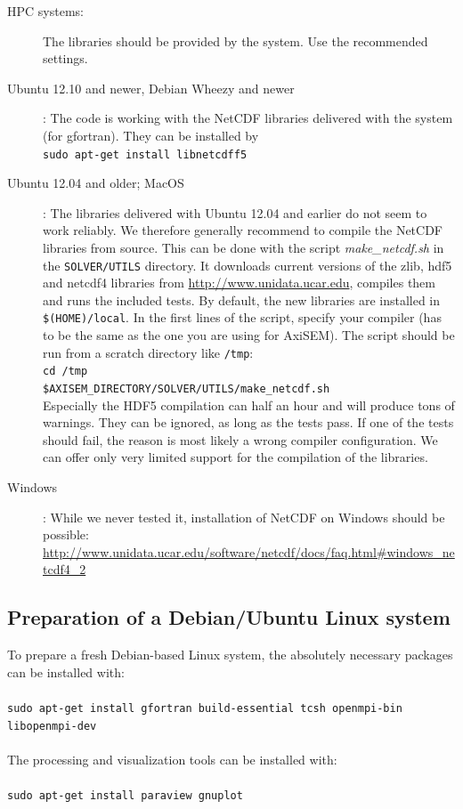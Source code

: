 \documentclass{article}
\begin{document}
\begin{description}
    \item[HPC systems:] The libraries should be provided by the system. Use the
          recommended settings.
    \item[Ubuntu 12.10 and newer, Debian Wheezy and newer]: The code is working with the NetCDF libraries delivered
          with the system (for gfortran). They can be installed by \\
          \verb|sudo apt-get install libnetcdff5|
    \item[Ubuntu 12.04 and older; MacOS]: The libraries delivered with Ubuntu 12.04 and
          earlier do not seem to work reliably. We therefore generally recommend to
          compile the NetCDF libraries from source. This can be done with the script
          \textit{make\_netcdf.sh} in the \verb|SOLVER/UTILS| directory. It downloads
          current versions of the zlib, hdf5 and netcdf4 libraries from
          \url{http://www.unidata.ucar.edu}, compiles them and runs the included tests. By
          default, the new libraries are installed in \verb|$(HOME)/local|. In the first
          lines of the script, specify your compiler (has to be the same as the one you
          are using for AxiSEM). The script should be run from a scratch directory like
          \verb|/tmp|:\\
          \verb|cd /tmp|\\
          \verb|$AXISEM_DIRECTORY/SOLVER/UTILS/make_netcdf.sh|\\
          Especially the HDF5 compilation can half an hour and will produce tons of warnings. They can be
          ignored, as long as the tests pass. If one of the tests should fail, the reason
          is most likely a wrong compiler configuration. We can offer only very limited
          support for the compilation of the libraries.
    \item[Windows]: While we never tested it, installation of NetCDF on Windows should be
          possible: \url{http://www.unidata.ucar.edu/software/netcdf/docs/faq.html#windows_netcdf4_2}
\end{description}


\subsection{Preparation of a Debian/Ubuntu Linux system}
To prepare a fresh Debian-based Linux system, the absolutely necessary packages can be installed with:\\ \\
 \verb|sudo apt-get install gfortran build-essential tcsh openmpi-bin libopenmpi-dev|\\ \\
The processing and visualization tools can be installed with:\\ \\
 \verb|sudo apt-get install paraview gnuplot|
\end{document}
